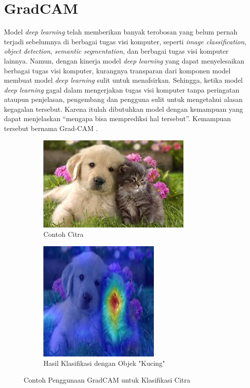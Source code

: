 \section{GradCAM}
\label{sec:gradcam}

Model \emph{deep learning} telah memberikan banyak terobosan yang belum pernah terjadi \linebreak sebelumnya di berbagai tugas visi komputer, seperti \emph{image classification}, \emph{object detection}, \emph{semantic segmentation}, 
dan berbagai tugas visi komputer lainnya. Namun, dengan kinerja model \emph{deep learning} yang dapat menyelesaikan berbagai tugas visi komputer, kurangnya transparan dari komponen model membuat model \emph{deep learning} 
sulit untuk menafsirkan. Sehingga, ketika model \emph{deep learning} gagal dalam mengerjakan tugas visi komputer tanpa peringatan ataupun penjelasan, pengembang dan pengguna 
sulit untuk mengetahui alasan kegagalan tersebut. \linebreak Karena itulah dibutuhkan model dengan kemampuan yang dapat menjelaskan “mengapa bisa memprediksi hal tersebut”. Kemampuan 
tersebut bernama Grad-CAM \parencite{Selvaraju2019}.

\begin{figure}[h!]
  \centering
  \begin{subfigure}{.5\textwidth}
    \centering
    \includegraphics[width=.6\linewidth]{gambar/dog_cat.jpg}
    \caption{Contoh Citra}
    \label{fig:contohcitraGradCAM}
  \end{subfigure}%
  \begin{subfigure}{.5\textwidth}
    \centering
    \includegraphics[width=.4\linewidth]{gambar/swinT_cat_gradcam_cam.jpg}
    \caption{Hasil Klasifikasi dengan Objek "Kucing"}
    \label{hasilklasifikasiobjekGradCAM}
  \end{subfigure}
  \caption{Contoh Penggunaan GradCAM untuk Klasifikasi Citra}
  \label{fig:contohpenggunaangradcamuntukklasifikasicitra}
\end{figure}

